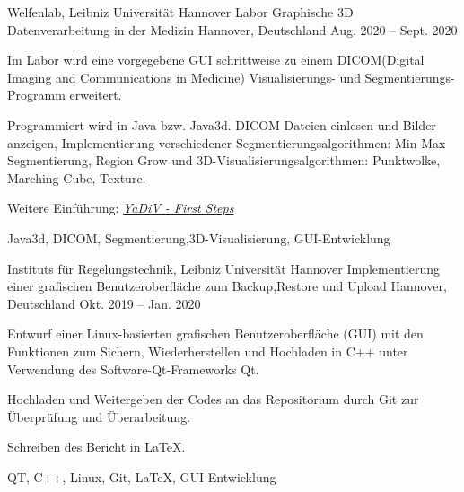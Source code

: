 

\begin{cventries}

 \cventry
 {Welfenlab, Leibniz Universität Hannover} %
 {Labor Graphische 3D Datenverarbeitung in der Medizin} %
 {Hannover, Deutschland} %
 {Aug. 2020 – Sept. 2020} %
 {
 	\begin{cvitems} %
 		\item {Im Labor wird eine vorgegebene GUI schrittweise zu einem DICOM(Digital Imaging and Communications in Medicine) Visualisierungs- und Segmentierungs-Programm erweitert.}
 		\item {Programmiert wird in Java bzw. Java3d. DICOM Dateien einlesen und Bilder anzeigen, Implementierung verschiedener Segmentierungsalgorithmen: Min-Max Segmentierung, Region Grow und 3D-Visualisierungsalgorithmen: Punktwolke, Marching Cube, Texture.}
 		\item {Weitere Einführung: \textsl{\href{http://www.welfenlab.de/fileadmin/forschung/gebiete/YaDiV/docu/YaDiV_first_steps.html}{YaDiV - First Steps}}}
 	\end{cvitems}
 	}
 {Java3d, DICOM, Segmentierung,3D-Visualisierung, GUI-Entwicklung}

\cventry
{Instituts für Regelungstechnik, Leibniz Universität Hannover} %
{Implementierung einer grafischen Benutzeroberfläche zum Backup,Restore und Upload} %
{Hannover, Deutschland} %
{Okt. 2019 – Jan. 2020} %
{
	\begin{cvitems} %
		\item {Entwurf einer Linux-basierten grafischen Benutzeroberfläche (GUI) mit den Funktionen zum Sichern, Wiederherstellen und Hochladen in C++ unter Verwendung des Software-Qt-Frameworks Qt.}
		\item{Hochladen und Weitergeben der Codes an das Repositorium durch Git zur Überprüfung und Überarbeitung.}
		\item {Schreiben des Bericht in LaTeX.}
	\end{cvitems}
	}
{QT, C++, Linux, Git, \LaTeX, GUI-Entwicklung}


\end{cventries}
